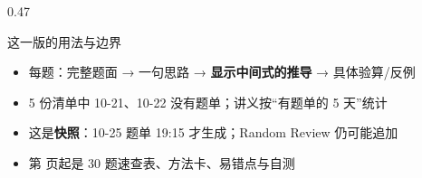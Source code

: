 \documentclass[aspectratio=169,10pt,fontset=none]{ctexbeamer}
\begin{document}
\begin{frame}[plain]
\begin{columns}[T,onlytextwidth]
\begin{column}{0.47\textwidth}
\begin{block}{这一版的用法与边界}
\begin{itemize}
          \item 每题：完整题面 → 一句思路 → \textbf{显示中间式的推导} → 具体验算/反例
          \item 5 份清单中 10-21、10-22 没有题单；讲义按“有题单的 5 天”统计
          \item 这是\textbf{快照}：10-25 题单 19:15 才生成；Random Review 仍可能追加
          \item 第 \pageref{sec:answers} 页起是 30 题速查表、方法卡、易错点与自测
        \end{itemize}
      \end{block}
    \end{column}
  \end{columns}
\end{frame}

\end{document}
